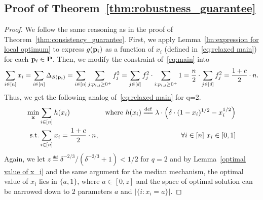 \subsection{Proof of Theorem~\ref{thm:robustness_guarantee}}
\begin{proof}


We follow the same reasoning as in the proof of Theorem~\ref{thm:consistency_guarantee}. First, we apply Lemma~\ref{lm:expression for local optimum} to express $g(\mathbf{p}_{i})$ as a function of $x_i$ (defined in~\eqref{eq:relaxed main}) for each $\mathbf{p}_{i}\in\mathbf{P}$. 
Then, we modify the constraint of~\eqref{eq:main} into
\begin{align}
    \label{eq: robustness relaxed_median_constraint}
    \sum\limits_{i\in[n]}x_i=\sum\limits_{i\in[n]}\energy[S(\loci)]=
    \sum_{i\in[n]}\sum_{j:p_{i,j}\ge 0^+}f_j^2
    =\sum_{j\in[d]}f_j^2\cdot\sum_{i:p_{i,j}\ge 0^+}1
    =\frac{n}{2}\cdot\sum_{j\in[d]}f_j^2=\frac{1+c}{2}\cdot n.
\end{align}
Thus, we get the following analog of~\eqref{eq:relaxed main} for q=2. 
\begin{align}
 \label{eq:robustness relaxed main}
 \min\limits_{\vx}& \sum_{i\in[n]} h(x_i)
 &\text{where }h(x_i)
 \eqdef \lambda\cdot\left(\delta\cdot(1-x_i)^{1/2}- x_i^{1/2}\right)\nonumber\\
 \text{s.t.}&  \sum_{i\in [n]}x_i = \frac{1+c}{2}\cdot n,&
\quad\quad \forall i\in[n]~x_i\in[0,1]
\end{align}
Again, we let $z\eqdef \delta^{-2/3}/(\delta^{-2/3}+1)<1/2$ for $q=2$ and by Lemma~\ref{optimal value of x_i} and the same argument for the median mechanism, the optimal value of $x_i$ lies in $\{ a,1\}$, where $a\in[0,z]$ and the space of optimal solution can be narrowed down to 2 parameters $a$ and $|\{i: x_i=a\}|$.


\end{proof}
